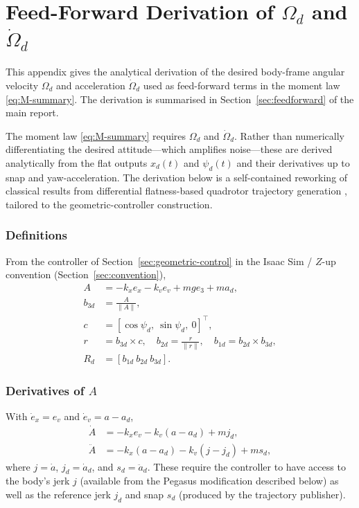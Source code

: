 \documentclass[11pt]{article}
\theoremstyle{remark}
\begin{document}
\section{Feed-Forward Derivation of \texorpdfstring{$\Omega_d$ and $\dot\Omega_d$}{Omega-d and Omega-d-dot}}
\label{app:feedforward}

This appendix gives the analytical derivation of the desired body-frame angular velocity $\Omega_d$ and acceleration $\dot\Omega_d$ used as feed-forward terms in the moment law \eqref{eq:M-summary}. The derivation is summarised in Section~\ref{sec:feedforward} of the main report.

The moment law \eqref{eq:M-summary} requires $\Omega_d$ and $\dot\Omega_d$. Rather than numerically differentiating the desired attitude---which amplifies noise---these are derived analytically from the flat outputs $x_d(t)$ and $\psi_d(t)$ and their derivatives up to snap and yaw-acceleration. The derivation below is a self-contained reworking of classical results from differential flatness-based quadrotor trajectory generation \cite{Mellinger2011}, tailored to the geometric-controller construction.

\subsubsection{Definitions}
From the controller of Section~\ref{sec:geometric-control} in the Isaac Sim / $Z$-up convention (Section~\ref{sec:convention}),
\begin{align}
    A &= -k_x e_x - k_v e_v + m g e_3 + m a_d,\\
    b_{3d} &= \tfrac{A}{\|A\|},\\
    c &= [\cos\psi_d,\ \sin\psi_d,\ 0]^\top,\\
    r &= b_{3d}\times c,\quad b_{2d} = \tfrac{r}{\|r\|},\quad b_{1d} = b_{2d}\times b_{3d},\\
    R_d &= [b_{1d}\ b_{2d}\ b_{3d}].
\end{align}

\subsubsection{Derivatives of $A$}
With $\dot e_x = e_v$ and $\dot e_v = a - a_d$,
\begin{align}
\dot A &= -k_x e_v - k_v(a - a_d) + m j_d,\\
\ddot A &= -k_x(a - a_d) - k_v(j - j_d) + m s_d,
\end{align}
where $j = \dot a$, $j_d = \dot a_d$, and $s_d = \ddot a_d$. These require the controller to have access to the body's jerk $j$ (available from the Pegasus modification described below) as well as the reference jerk $j_d$ and snap $s_d$ (produced by the trajectory publisher).
\end{document}
